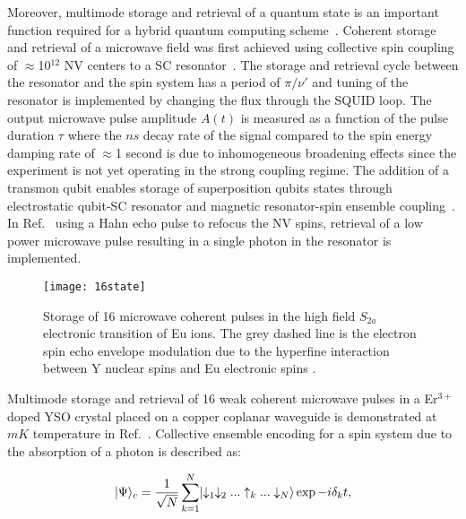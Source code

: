 Moreover, multimode storage and retrieval of a quantum state is an important function required for a hybrid quantum computing scheme~\citep{Kurizki3866}. Coherent storage and retrieval of a microwave field was first achieved using collective spin coupling of $\approx$10$^12$ NV centers to a SC resonator~\citep{PhysRevA.92.020301}. The storage and retrieval cycle between the resonator and the spin system has a period of $\pi / \nu'$ and tuning of the resonator is implemented by changing the flux through the SQUID loop. The output microwave pulse amplitude $A(t)$ is measured as a function of the pulse duration $\tau$ where the $ns$ decay rate of the signal compared to the spin energy damping rate of $\approx$1 second is due to inhomogeneous broadening effects since the experiment is not yet operating in the strong coupling regime. The addition of a transmon qubit enables storage of superposition qubits states through electrostatic qubit-SC resonator and magnetic resonator-spin ensemble coupling~\citep{PhysRevLett.107.220501}. In Ref.~\citep{PhysRevA.92.020301} using a Hahn echo pulse to refocus the NV spins, retrieval of a low power microwave pulse resulting in a single photon in the resonator is implemented.

\begin{figure}[h]
\centering
\texttt{[image: 16state]}
\caption{\label{fig:16state} Storage of 16 microwave coherent pulses in the high field $S_{2a}$ electronic transition of Eu ions. The grey dashed line is the electron spin echo envelope modulation due to the hyperfine interaction between Y nuclear spins and Eu electronic spins \citep{PhysRevB.92.014421}.}
\end{figure}

Multimode storage and retrieval of 16 weak coherent microwave pulses in a Er$^{3+}$ doped YSO crystal placed on a copper coplanar waveguide is demonstrated at $mK$ temperature in Ref.~\citep{PhysRevB.92.014421}. Collective ensemble encoding for a spin system due to the absorption of a photon is described as:

\begin{equation}
\label{eq:qubit}
\lvert\Psi\rangle_{c} = \frac{1}{\sqrt{N}} \sum_{k=1}^{N}\lvert\downarrow_{1} \downarrow_{2}...\uparrow_{k}...\downarrow_{N}\rangle\exp{-i\delta_{k}t}, 
\end{equation} 

